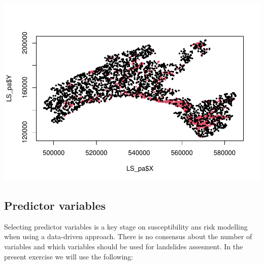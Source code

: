\documentclass[
]{book}
\newenvironment{Shaded}{\begin{snugshade}}{\end{snugshade}}
\newcommand{\AttributeTok}[1]{\textcolor[rgb]{0.13,0.29,0.53}{#1}}
\newcommand{\CommentTok}[1]{\textcolor[rgb]{0.56,0.35,0.01}{\textit{#1}}}
\newcommand{\DecValTok}[1]{\textcolor[rgb]{0.00,0.00,0.81}{#1}}
\newcommand{\DocumentationTok}[1]{\textcolor[rgb]{0.56,0.35,0.01}{\textbf{\textit{#1}}}}
\newcommand{\FloatTok}[1]{\textcolor[rgb]{0.00,0.00,0.81}{#1}}
\newcommand{\FunctionTok}[1]{\textcolor[rgb]{0.13,0.29,0.53}{\textbf{#1}}}
\newcommand{\NormalTok}[1]{#1}
\newcommand{\OtherTok}[1]{\textcolor[rgb]{0.56,0.35,0.01}{#1}}
\newcommand{\SpecialCharTok}[1]{\textcolor[rgb]{0.81,0.36,0.00}{\textbf{#1}}}
\newcommand{\StringTok}[1]{\textcolor[rgb]{0.31,0.60,0.02}{#1}}
\begin{document}
\begin{Shaded}
\end{Shaded}

\includegraphics{06-RF_files/figure-latex/import-data-1.pdf}

\hypertarget{predictor-variables}{%
\subsection{Predictor variables}\label{predictor-variables}}

Selecting predictor variables is a key stage on susceptibility ans risk modelling when using a data-driven approach.
There is no consensus about the number of variables and which variables should be used for landslides assesment.
In the present exercise we will use the following:
\end{document}
